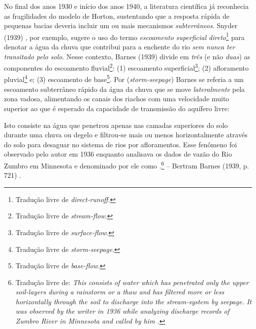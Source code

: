 \documentclass[./main.tex]{subfiles}
\begin{document}
\par No final dos anos 1930 e início dos anos 1940, a literatura científica já reconhecia as fragilidades do modelo de Horton, sustentando que a resposta rápida de pequenas bacias deveria incluir um ou mais mecanismos \textit{subterrâneos}. Snyder (1939) \cite{Snyder1939}, por exemplo, sugere o uso do termo \textit{escoamento superficial direto}\footnote{Tradução livre de \textit{direct-runoff}.} para denotar a água da chuva que contribui para a enchente do rio \textit{sem nunca ter transitado pelo solo}. Nesse contexto, Barnes (1939) \cite{Barnes1939} divide em \textit{três} (e não \textit{duas}) as componentes do escoamento fluvial\footnote{Tradução livre de \textit{stream-flow}.}: (1) escoamento superficial\footnote{Tradução livre de \textit{surface-flow}.}; (2) afloramento pluvial\footnote{Tradução livre de \textit{storm-seepage}.} e; (3) escoamento de base\footnote{Tradução livre de \textit{base-flow}.}. Por  (\textit{storm-seepage}) Barnes se referia a um escoamento subterrâneo rápido da água da chuva que se move \textit{lateralmente} pela zona vadosa, alimentando os canais dos riachos com uma velocidade muito superior ao que é esperado da capacidade de transmissão do aquífero livre:

\begin{adjustwidth}{100pt}{0pt}
\medskip
\small Isto consiste na água que penetrou apenas nas camadas superiores do solo durante uma chuva ou degelo e filtrou-se mais ou menos horizontalmente através do solo para desaguar no sistema de rios por afloramentos. Esse fenômeno foi observado pelo autor em 1936 enquanto analisava os dados de vazão do Rio Zumbro em Minnesota e denominado por ele como .\footnote{Tradução livre de: \textit{This consists of water which has penetrated only the upper soil-layers during a rainstorm or a thaw and has filtered more or less horizontally through the soil to discharge into the stream-system by seepage. It was observed by the writer in 1936 while analyzing discharge records of Zumbro River in Minnesota and called by him .}} -- Bertram Barnes (1939, p. 721) \cite{Barnes1939}.
\medskip
\end{adjustwidth}
\end{document}
